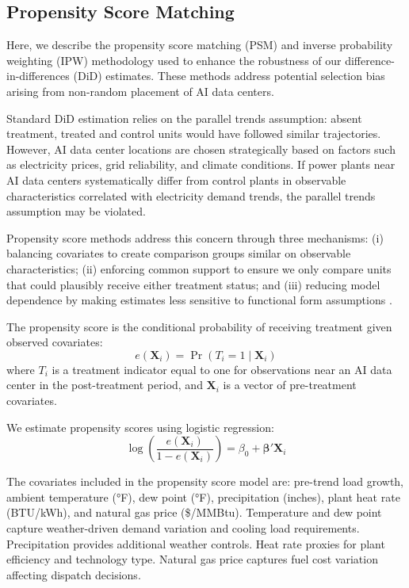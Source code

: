 \documentclass[sigconf]{acmart}
\begin{document}
\subsection{Propensity Score Matching}

Here, we describe the propensity score matching (PSM) and inverse probability weighting (IPW) methodology used to enhance the robustness of our difference-in-differences (DiD) estimates. These methods address potential selection bias arising from non-random placement of AI data centers.

Standard DiD estimation relies on the parallel trends assumption: absent treatment, treated and control units would have followed similar trajectories. However, AI data center locations are chosen strategically based on factors such as electricity prices, grid reliability, and climate conditions. If power plants near AI data centers systematically differ from control plants in observable characteristics correlated with electricity demand trends, the parallel trends assumption may be violated.

Propensity score methods address this concern through three mechanisms: (i) balancing covariates to create comparison groups similar on observable characteristics; (ii) enforcing common support to ensure we only compare units that could plausibly receive either treatment status; and (iii) reducing model dependence by making estimates less sensitive to functional form assumptions \citep{rosenbaum1983central, hirano2003efficient}.

The propensity score is the conditional probability of receiving treatment given observed covariates:
\begin{equation}
    e(\mathbf{X}_i) = \Pr(T_i = 1 \mid \mathbf{X}_i)
\end{equation}
where $T_i$ is a treatment indicator equal to one for observations near an AI data center in the post-treatment period, and $\mathbf{X}_i$ is a vector of pre-treatment covariates.

We estimate propensity scores using logistic regression:
\begin{equation}
    \log\left(\frac{e(\mathbf{X}_i)}{1 - e(\mathbf{X}_i)}\right) = \beta_0 + \boldsymbol{\beta}'\mathbf{X}_i
\end{equation}

The covariates included in the propensity score model are: pre-trend load growth, ambient temperature (°F), dew point (°F), precipitation (inches), plant heat rate (BTU/kWh), and natural gas price (\$/MMBtu). Temperature and dew point capture weather-driven demand variation and cooling load requirements. Precipitation provides additional weather controls. Heat rate proxies for plant efficiency and technology type. Natural gas price captures fuel cost variation affecting dispatch decisions.
\end{document}
